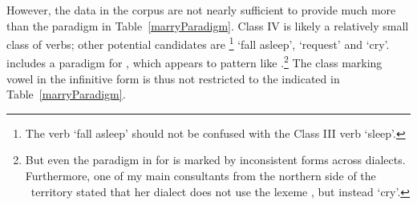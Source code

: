 However, the data in the corpus are not nearly sufficient to provide much more than the paradigm in Table~\vref{marryParadigm}. %
Class IV is likely a relatively small class of verbs; other potential candidates are \mbox{}\footnote{The verb  ‘fall asleep’ should not be confused with the Class III verb {} ‘sleep’.} %
‘fall asleep’,  ‘request’ and  ‘cry’. \citet[154]{Lehtiranta1992} includes a paradigm for , which appears to pattern like .\footnote{But even the paradigm in \citet[154]{Lehtiranta1992} for  is marked by inconsistent forms across dialects. Furthermore, one of my main consultants from the northern side of the \PS\ territory stated that her dialect does not use the lexeme , but instead  ‘cry’.} 
The class marking vowel in the infinitive form is thus not restricted to the  indicated in Table~\vref{marryParadigm}. 

